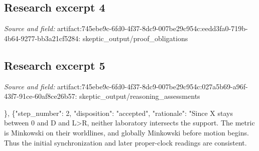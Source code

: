 \documentclass[11pt]{article}
\begin{document}
\subsection{Research excerpt 4}
\textit{Source and field: }artifact:745ebe9c-6fd0-4f37-8dc9-007be29c954c:eedd3fa0-719b-4b64-9277-bb3a21cf5284: skeptic\_output/proof\_obligations\par
["Local density sign: supported by cycle 1, investigator step 27d543af-13af-4f83-a2bc-f75edc5bad40, reasoning steps 1–2, using the explicit metric and Hamiltonian constraint.", "Profile-independent slice-energy bound: supported by cycle 1, investigator step 27d543af-13af-4f83-a2bc-f75edc5bad40, reasoning step 3, using angular integration and weighted Cauchy–Schwarz.", "Dimensional and illustrative arithmetic consistency: supported by cycle 1, investigator step 27d543af-13af-4f83-a2bc-f75edc5bad40, reasoning step 4; this is not executed numerical evidence.", "Local-motion and single-metric causality distinction: supported by cycle 1, investigator step 27d543af-13af-4f83-a2bc-f75edc5bad40, reasoning step 5, using the central line element and temporal function.", "Exclusion of entirely weak-energy-condition-respecting total sources: supported by cycle 1, investigator step 27d543af-13af-4f83-a2bc-f75edc5bad40, reasoning steps 2 and 7, within the listed assumptions.", "Primary-source verification, full source compatibility, dynamical stability and control, and operational performance remain open; cycle 1 does not establish them."]

\subsection{Research excerpt 5}
\textit{Source and field: }artifact:745ebe9c-6fd0-4f37-8dc9-007be29c954c:027a5b69-a96f-43f7-91ce-60af8ce26b57: skeptic\_output/reasoning\_assessments\par
[\{"step\_number": 1, "disposition": "accepted", "rationale": "Accepted as an explicit mathematical premise, not a realizability result. Differentiating the stated polynomial gives the stated velocity, whose maximum occurs at s=1/2 and equals 35D/(16T). The compact profile is smooth at its support boundary. The joined X is $C^{3}$, making v and the metric at least $C^{2}$.", "objection": "", "basis\_artifact\_ids": []\}, \{"step\_number": 2, "disposition": "accepted", "rationale": "Since X stays between 0 and D and L\textgreater{}R, neither laboratory intersects the support. The metric is Minkowski on their worldlines, and globally Minkowski before motion begins. Thus the initial synchronization and later proper-clock readings are consistent.
\end{document}
